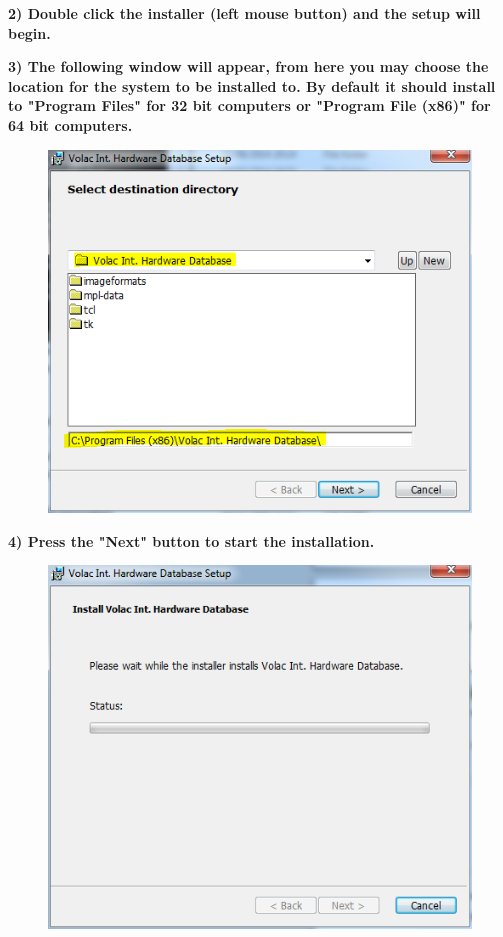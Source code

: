 \textbf{2) Double click the installer (left mouse button) and the setup will begin.}

\newpage

\textbf{3) The following window will appear, from here you may choose the location for the system to be installed to. By default it should install to "Program Files" for 32 bit computers or "Program File (x86)" for 64 bit computers.}

\begin{figure}[H]
    \includegraphics[width=\textwidth]{./Manual/Images/Tut2.png}
\end{figure}

\newpage

\textbf{4) Press the "Next" button to start the installation.}

\begin{figure}[H]
    \includegraphics[width=\textwidth]{./Manual/Images/Tut3.png}
\end{figure}

